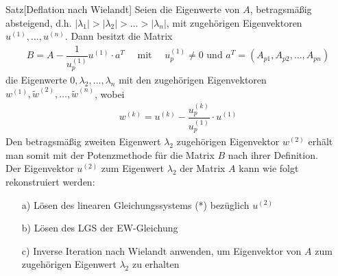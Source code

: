 \begin{colbox}{Satz}[Deflation nach Wielandt]
  Seien die Eigenwerte von $A$, betragsmäßig absteigend, d.h. 
  $|\lambda_1|>|\lambda_2|>\dots>|\lambda_n|$, mit zugehörigen Eigenvektoren $u^{(1)},\dots,u^{(n)}$.
  Dann besitzt die Matrix 
  \begin{align*}
    B 
    = A - \dfrac{1}{u_p^{(1)}} u^{(1)}\cdot a^T
    \quad\text{ mit }\quad u_p^{(1)}
    \neq 0 
    \text{ und } a^T=(A_{p1},A_{p2},\dots,A_{pn})
  \end{align*}
  die Eigenwerte $0,\lambda_2,\dots,\lambda_n$ mit den zugehörigen Eigenvektoren 
  $w^{(1)},\tilde{w}^{(2)},\dots,\tilde{w}^{(n)}$, wobei
  \begin{align*}
    w^{(k)} 
    = u^{(k)} - \dfrac{u_p^{(k)}}{u_p^{(1)}}\cdot u^{(1)}\tag{*}
  \end{align*}
  Den betragsmäßig zweiten Eigenwert $\lambda_2$ zugehörigen Eigenvektor $w^{(2)}$ erhält man somit mit der 
  Potenzmethode für die Matrix $B$ nach ihrer Definition. \\ 
  Der Eigenvektor $u^{(2)}$ zum Eigenwert $\lambda_2$ der Matrix $A$ kann wie folgt rekonstruiert werden:
  \begin{enumerate}
    \item[a)] Lösen des linearen Gleichungssystems (*) bezüglich $u^{(2)}$ 
    \item[b)] Lösen des LGS der EW-Gleichung  
    \item[c)] Inverse Iteration nach Wielandt anwenden, um Eigenvektor von $A$ zum zugehörigen Eigenwert
    $\lambda_2$ zu erhalten 
  \end{enumerate}
\end{colbox}

